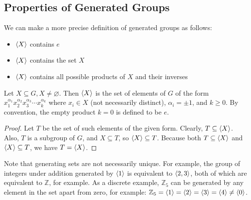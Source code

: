 \subsection{Properties of Generated Groups}
We can make a more precise definition of generated groups as follows:
\begin{itemize}
	\item \(\langle{} X \rangle\) contains \(e\)
	\item \(\langle{} X \rangle\) contains the set \(X\)
	\item \(\langle{} X \rangle\) contains all possible products of \(X\) and their inverses
\end{itemize}

\begin{proposition}
	Let \(X \subseteq G, X \neq \varnothing\).
	Then \(\langle{} X \rangle\) is the set of elements of \(G\) of the form \(x_1^{\alpha_1} x_2^{\alpha_2} x_3^{\alpha_3} \cdots x_k^{\alpha_k}\) where \(x_i \in X\) (not necessarily distinct), \(\alpha_i = \pm 1\), and \(k \geq 0\).
	By convention, the empty product \(k=0\) is defined to be \(e\).
\end{proposition}
\begin{proof}
	Let \(T\) be the set of such elements of the given form.
	Clearly, \(T \subseteq \langle{} X \rangle\).
	Also, \(T\) is a subgroup of \(G\), and \(X \subseteq T\), so \(\langle{} X \rangle \subseteq T\).
	Because both \(T \subseteq \langle{} X \rangle\) and \(\langle{} X \rangle \subseteq T\), we have \(T = \langle{} X \rangle\).
\end{proof}
Note that generating sets are not necessarily unique.
For example, the group of integers under addition generated by \(\langle{} 1 \rangle\) is equivalent to \(\langle{} 2, 3 \rangle\), both of which are equivalent to \(\mathbb Z\), for example.
As a discrete example, \(\mathbb Z_5\) can be generated by any element in the set apart from zero, for example: \(\mathbb Z_5 = \langle{} 1 \rangle = \langle{} 2 \rangle = \langle{} 3 \rangle = \langle{} 4 \rangle \neq \langle{} 0 \rangle\).

